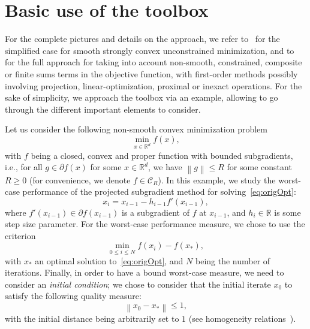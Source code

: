 \documentclass[11pt,a4paper]{article}
\newcommand{\norm}[1]{{\left\lVert#1\right\rVert}}
\newcommand{\Rd}{\mathbb{R}^d}
\newcommand{\real}{\mathbb{R}}
\begin{document}
\section{Basic use of the toolbox}	%
\label{sec:basicuse}

For the complete pictures and details on the approach, we refer to~\cite[Section 1\&3]{taylor2015smooth} for the simplified case for smooth strongly convex unconstrained minimization, and to~\cite[Section 1\&2]{taylor2015exact} for the full approach for taking into account non-smooth, constrained, composite or finite sums terms in the objective function, with first-order methods possibly involving projection, linear-optimization, proximal or inexact operations. For the sake of simplicity, we approach the toolbox via an example, allowing to go through the different important elements to consider.

Let us consider the following non-smooth convex minimization problem
\begin{equation}
\min_{x\in\Rd} f(x),\tag{OPT}\label{eq:origOpt}
\end{equation}
with $f$ being a closed, convex and proper function with bounded subgradients, i.e., for all $g\in\partial f(x)$ for some $x\in\Rd$, we have $\norm{g}\leq R$ for some constant $R\geq 0$ (for convenience, we denote $f\in \mathcal{C}_R$). 
In this example, we study the worst-case performance of the projected subgradient method for solving~\eqref{eq:origOpt}:
\begin{equation}
x_{i}=x_{i-1}-h_{i-1}f'(x_{i-1}),\label{eq:subgrad}
\end{equation}
where  $f'(x_{i-1})\in\partial f(x_{i-1})$ is a subgradient of $f$ at $x_{i-1}$, and $h_i\in\real$ is some step size parameter. For the worst-case performance measure, we chose to use the criterion \[\min_{0\leq i\leq N} f(x_i)-f(x_*),\]
with $x_*$ an optimal solution to~\eqref{eq:origOpt}, and $N$ being the number of iterations. Finally, in order to have a bound worst-case measure, we need to consider an \emph{initial condition}; we chose to consider that the initial iterate $x_0$ to satisfy the following quality measure:
\[ \norm{x_0-x_*}\leq 1,\] with the initial distance being arbitrarily set to $1$ (see homogeneity relations~\cite[Section 3.5]{taylor2015smooth}).
\end{document}

